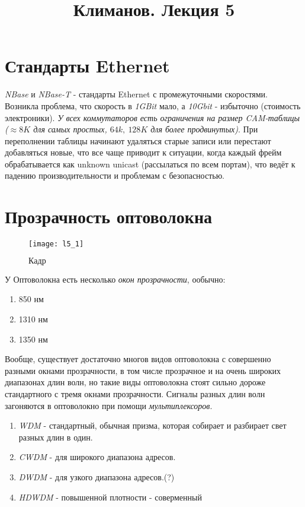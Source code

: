 \documentclass[a4paper,10pt]{article}
\title{Климанов. Лекция 5}
\begin{document}
	\maketitle
	\section{Стандарты Ethernet}
	\emph{NBase} и \emph{NBase-T} - стандарты Ethernet с промежуточными скоростями.
	Возникла проблема, что скорость в \emph{1GBit} мало, а \emph{10Gbit} - избыточно (стоимость электроники).
	\textit{У всех коммутаторов есть ограничения на размер CAM-таблицы ($ \approx 8K $ для самых простых, $ 64k,\ 128K $ для более продвинутых)}. При переполнении таблицы начинают удаляться старые записи или перестают добавляться новые, что все чаще приводит к ситуации, когда каждый фрейм обрабатывается как unknown unicast (рассылаться по всем портам), что ведёт к падению производительности и проблемам с безопасностью.
	\section{Прозрачность оптоволокна}
	\begin{figure}[h]
		\texttt{[image: l5\_1]}
		\caption{$Кадр$}
	\end{figure}
	У Оптоволокна есть несколько \emph{окон прозрачности}, ообычно:
	\begin{enumerate}
		\item 850 нм
		\item 1310 нм
		\item 1350 нм
	\end{enumerate}
	Вообще, существует достаточно многов видов оптоволокна с совершенно разными окнами прозрачности, в том числе прозрачное и на очень широких диапазонах длин волн, но такие виды оптоволокна стоят сильно дороже стандартного с тремя окнами прозрачности.
	\newpage
	Сигналы разных длин волн загоняются в оптоволокно при помощи \emph{мультиплексоров}. 
	\begin{enumerate}
		\item \emph{WDM} - стандартный, обычная призма, которая собирает и разбирает свет разных длин в один.
		\item \emph{CWDM} - для широкого диапазона адресов.
		\item \emph{DWDM} - для узкого диапазона адресов.(?)
		\item \emph{HDWDM} - повышенной плотности - соверменный	
	\end{enumerate}
\end{document}
